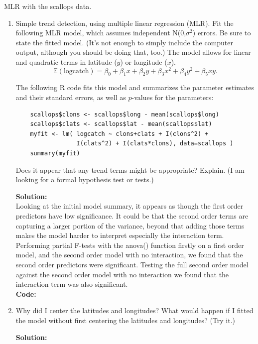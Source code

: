 \documentclass[12pt]{article}
\makeatletter
\theoremstyle{homework}
\newenvironment{exercise}[1]
{\def\@currentlabel{#1}\exercisecore}
{\endexercisecore}
\newcommand{\localhead}[1]{\par\smallskip\noindent\textbf{#1}\nobreak\\}%
\newcommand\solution{\localhead{Solution:}}
\makeatother
\begin{document}
\begin{exercise}{3}MLR with the scallops data.\\
  \begin{enumerate}
    \item Simple trend detection, using multiple linear regression (MLR).
      Fit the following MLR model, which assumes independent N(0,$\sigma^2$)
    errors.  Be sure to state the fitted
  model. (It's not enough to simply include the computer output, although you 
  should be doing that, too.)
  The model allows for linear and quadratic terms in latitude ($y$) or longitude ($x$).
    $$\mathbb{E}({\mbox{logcatch}}) = \beta_0 + \beta_1 x + \beta_2 y + \beta_3 x^2
    + \beta_4 y^2 + \beta_5 xy.$$
  
    The following R code fits this model and summarizes the parameter estimates and their
    standard errors, as well as $p$-values for the parameters:
    \begin{verbatim}
    scallops$clons <- scallops$long - mean(scallops$long)
    scallops$clats <- scallops$lat - mean(scallops$lat)
    myfit <- lm( logcatch ~ clons+clats + I(clons^2) +
                 I(clats^2) + I(clats*clons), data=scallops )
    summary(myfit)
    \end{verbatim}
    Does it appear that any trend terms might be appropriate?  Explain.  (I am looking
  for a formal hypothesis test or tests.)\\
  \solution Looking at the initial model summary, it appears as though the first order predictors have low significance. It could be 
  that the second order terms are capturing a larger portion of the variance, beyond that adding those terms makes the model harder to interpret
  especially the interaction term. Performing partial F-tests with the anova() function firstly on a first order model, and the second order model with no interaction, 
  we found that the second order predictors were significant. Testing the full second order model against the second order model with no interaction we found that 
  the interaction term was also significant.\\
  \textbf{Code:}
  \begin{center}
  
  \end{center}
  \vspace{.15in}

  












  
  \item Why did I center the latitudes and longitudes? What would happen if I fitted
  the model without first centering the latitudes and longitudes? (Try it.)\\
  \solution
  \end{enumerate}
\end{exercise}
\vspace{1in}
\end{document}
